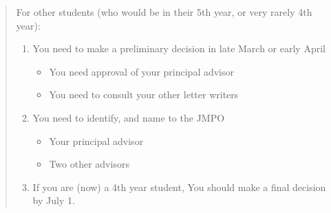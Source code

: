 \documentclass{\classes/econtex}
\begin{document}
\begin{enumerate}
\begin{quote}
    For other students (who would be in their 5th year, or very rarely 4th year):

    \begin{enumerate}
    \item You need to make a preliminary decision in late March or early April
      \begin{itemize}
      \item You need approval of your principal advisor
      \item You need to consult your other letter writers
      \end{itemize}
    \item You need to identify, and name to the JMPO
      \begin{itemize}
      \item Your principal advisor
      \item Two other advisors
      \end{itemize}
    \item If you are (now) a 4th year student, You should make a final decision by July 1.  
    \end{enumerate}
    

\end{quote}
\end{enumerate}
\end{document}
